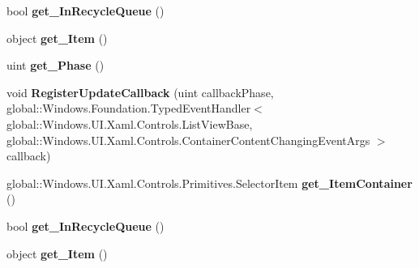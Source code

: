 \begin{DoxyCompactItemize}
bool {\bfseries get\+\_\+\+In\+Recycle\+Queue} ()
\item 
\mbox{\label{interface_windows_1_1_u_i_1_1_xaml_1_1_controls_1_1_i_container_content_changing_event_args_a10ddd7510b58dc1746dc1d24aa4f40ae}} 
object {\bfseries get\+\_\+\+Item} ()
\item 
\mbox{\label{interface_windows_1_1_u_i_1_1_xaml_1_1_controls_1_1_i_container_content_changing_event_args_a738ad9fa4dbda62eecb572e7177f20c5}} 
uint {\bfseries get\+\_\+\+Phase} ()
\item 
\mbox{\label{interface_windows_1_1_u_i_1_1_xaml_1_1_controls_1_1_i_container_content_changing_event_args_a667cd37ef9c242308e80a5eeb302226a}} 
void {\bfseries Register\+Update\+Callback} (uint callback\+Phase, global\+::\+Windows.\+Foundation.\+Typed\+Event\+Handler$<$ global\+::\+Windows.\+U\+I.\+Xaml.\+Controls.\+List\+View\+Base, global\+::\+Windows.\+U\+I.\+Xaml.\+Controls.\+Container\+Content\+Changing\+Event\+Args $>$ callback)
\item 
\mbox{\label{interface_windows_1_1_u_i_1_1_xaml_1_1_controls_1_1_i_container_content_changing_event_args_acbc05dfed05ddf98a734f2dfef63244c}} 
global\+::\+Windows.\+U\+I.\+Xaml.\+Controls.\+Primitives.\+Selector\+Item {\bfseries get\+\_\+\+Item\+Container} ()
\item 
\mbox{\label{interface_windows_1_1_u_i_1_1_xaml_1_1_controls_1_1_i_container_content_changing_event_args_a4d50cd4c2e41b7824eb299ae3a98881b}} 
bool {\bfseries get\+\_\+\+In\+Recycle\+Queue} ()
\item 
\mbox{\label{interface_windows_1_1_u_i_1_1_xaml_1_1_controls_1_1_i_container_content_changing_event_args_a10ddd7510b58dc1746dc1d24aa4f40ae}} 
object {\bfseries get\+\_\+\+Item} ()
\item 

\end{DoxyCompactItemize}
